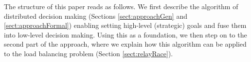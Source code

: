 The structure of this paper reads as follows.
We first describe the algorithm of distributed decision making (Sections \ref{sect:approachGen} and \ref{sect:approachFormal}) enabling setting high-level (strategic) goals and fuse them into low-level decision making.
Using this as a foundation, we then step on to the second part of the approach, where we explain how this algorithm can be applied to the load balancing problem (Section \ref{sect:relayRace}).

